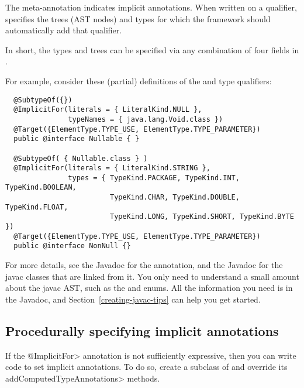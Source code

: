 The  meta-annotation indicates
implicit annotations.
When written on a qualifier, 
specifies the trees (AST nodes) and types for which the framework should
automatically add that qualifier.

In short, the types and trees can be
specified via any combination of four fields in .

For example, consider these (partial) definitions of the
 and
type qualifiers:

\begin{smaller}
\begin{Verbatim}
  @SubtypeOf({})
  @ImplicitFor(literals = { LiteralKind.NULL },
               typeNames = { java.lang.Void.class })
  @Target({ElementType.TYPE_USE, ElementType.TYPE_PARAMETER})
  public @interface Nullable { }

  @SubtypeOf( { Nullable.class } )
  @ImplicitFor(literals = { LiteralKind.STRING },
               types = { TypeKind.PACKAGE, TypeKind.INT, TypeKind.BOOLEAN,
                         TypeKind.CHAR, TypeKind.DOUBLE, TypeKind.FLOAT,
                         TypeKind.LONG, TypeKind.SHORT, TypeKind.BYTE })
  @Target({ElementType.TYPE_USE, ElementType.TYPE_PARAMETER})
  public @interface NonNull {}
\end{Verbatim}
\end{smaller}

For more details, see the Javadoc for the 
annotation, and the Javadoc for the javac classes that are linked from
it.  You only need to understand a small amount about the javac AST, such
as the
\href{\TreeAPIBase{}/tree/Tree.Kind.html?is-external=true}{}
and
enums.  All the information you need is in the Javadoc, and
Section~\ref{creating-javac-tips} can help you get started.


\subsection{Procedurally specifying implicit annotations\label{creating-procedurally-specifying-implicit-annotations}}

If the \<@ImplicitFor> annotation is not sufficiently expressive, then you
can write code to set implicit annotations.  To do so, create a subclass of
 and override its
\<addComputedTypeAnnotations> methods.


